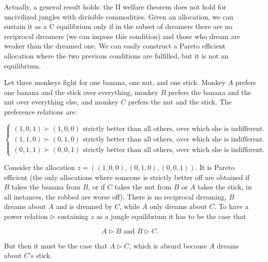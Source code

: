 Actually, a general result holds: the II welfare theorem does not hold for uncivilized jungles with divisible commodities. Given an allocation, we can sustain it as a C equilibrium only if in the subset of dreamers there are no reciprocal dreamers (we can impose this condition) and those who dream are weaker than the dreamed one. We can easily construct a Pareto efficient allocation where the two previous conditions are fulfilled, but it is not an equilibrium.

\begin{example}
    Let three monkeys fight for one banana, one nut, and one stick. Monkey $A$ prefers one banana and the stick over everything, monkey $B$ prefers the banana and the nut over everything else, and monkey $C$ prefers the nut and the stick. The preference relations are:

    \[\begin{cases}
        (1,0,1)\succ (1,0,0) \text{ strictly better than all others, over which she is indifferent.} \\
        (1,1,0)\succ (0,1,0)  \text{ strictly better than all others, over which she is indifferent.} \\
        (0,1,1)\succ (0,0,1)  \text{ strictly better than all others, over which she is indifferent.}
    \end{cases}\]

    Consider the allocation $z=((1,0,0),(0,1,0),(0,0,1))$. It is Pareto efficient (the only allocations where someone is strictly better off are obtained if $B$ takes the banana from $B$, or if $C$ takes the nut from $B$ or $A$ takes the stick, in all instances, the robbed are worse off). There is no reciprocal dreaming, $B$ dreams about $A$ and is dreamed by $C$, while $A$ only dreams about $C$. To have a power relation $\triangleright$ sustaining $z$ as a jungle equilibrium it has to be the case that

    \[A\triangleright B\text{ and } B\triangleright C.\]

    But then it must be the case that $A\triangleright C$, which is absurd because $A$ dreams about $C$'s stick.
\end{example}

